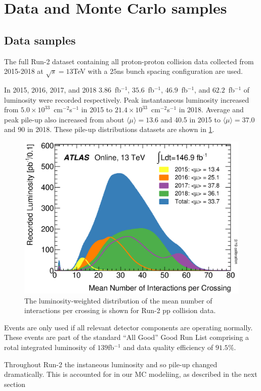 \section{Data and Monte Carlo samples}
\subsection{Data samples}

The full Run-2 dataset containing all proton-proton collision data collected from 2015-2018 at $\sqrt{s}=13$TeV with a $25$ns bunch spacing configuration are used.

In 2015, 2016, 2017, and 2018 $3.86$~fb$^{-1}$, $35.6$~fb$^{-1}$, $46.9$~fb$^{-1}$, and  $62.2$~fb$^{-1}$ of luminosity were recorded respectively. Peak instantaneous luminosity increased from $5.0\times 10^{33}$~cm$^{-2}$s$^{-1}$ in 2015 to $21.4\times 10^{33}$~cm$^{-2}$s$^{-1}$ in 2018. Average and peak pile-up also increased from about $\langle\mu\rangle=13.6$ and 40.5 in 2015 to  $\langle\mu\rangle=37.0$ and 90 in 2018. These pile-up distributions datasets are shown in \ref{fig:mu_profile}. 

\begin{figure}[!htbp]
    \centering 
    \includegraphics[width=0.55\linewidth]{Pictures/mu_2015_2018.eps}
    \caption{The luminosity-weighted distribution of the mean number of interactions per crossing is shown for Run-2 pp collision data. }
    \label{fig:mu_profile}
\end{figure}

Events are only used if all relevant detector components are operating normally. These events are part of the standard ``All Good'' Good Run List comprising a rotal integrated luminosity of $139$fb$^{-1}$ and data quality efficiency of $91.5$\%.

Throughout Run-2 the instaneous luminosity and so pile-up changed dramatically. This is accounted for in our MC modeliing, as described in the next section

